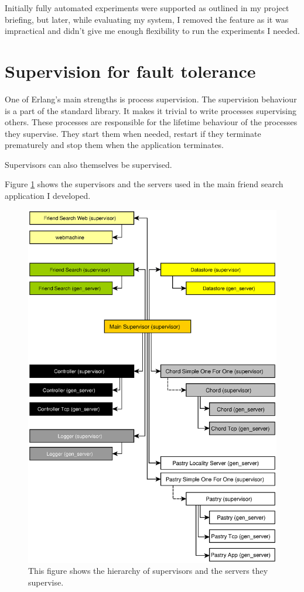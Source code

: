 Initially fully automated experiments were supported as outlined in my project briefing, but later, while evaluating my system, I removed the feature as it was impractical and didn't give me enough flexibility to run the experiments I needed.

\section{Supervision for fault tolerance}
One of Erlang's main strengths is process supervision.
The supervision behaviour is a part of the standard library. It makes it trivial to write processes supervising others. These processes are responsible for the lifetime behaviour of the processes they supervise. They start them when needed, restart if they terminate prematurely and stop them when the application terminates.

Supervisors can also themselves be supervised.

Figure \ref{figSupervisionTree} shows the supervisors and the servers used in the main friend search application I developed.

\begin{figure}[!htb]
\begin{center}
	\includegraphics[width=0.9\linewidth]{illustrations/ClientSupervisionTree.eps}
  \caption{This figure shows the hierarchy of supervisors and the servers they supervise.}
  \label{figSupervisionTree}
\end{center}
\end{figure}

